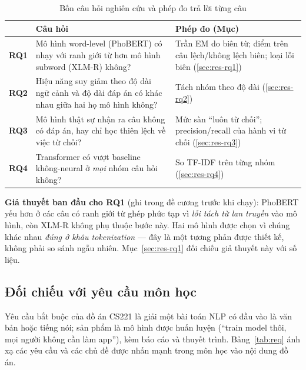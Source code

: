 \begin{table}[htbp]
\centering
\caption{Bốn câu hỏi nghiên cứu và phép đo trả lời từng câu}
\label{tab:rq}
\renewcommand{\arraystretch}{1.22}
\small
\begin{tabularx}{\textwidth}{@{}l L L@{}}
\toprule
& \textbf{Câu hỏi} & \textbf{Phép đo (Mục)} \\
\midrule
\textbf{RQ1} & Mô hình word-level (PhoBERT) có nhạy với ranh giới từ hơn mô hình subword (XLM-R) không? & Trần EM do biên từ; điểm trên câu lệch/không lệch biên; loại lỗi biên (\ref{sec:res-rq1}) \\
\textbf{RQ2} & Hiệu năng suy giảm theo độ dài ngữ cảnh và độ dài đáp án có khác nhau giữa hai họ mô hình không? & Tách nhóm theo độ dài (\ref{sec:res-rq2}) \\
\textbf{RQ3} & Mô hình thật sự nhận ra câu không có đáp án, hay chỉ học thiên lệch về việc từ chối? & Mức sàn ``luôn từ chối''; precision/recall của hành vi từ chối (\ref{sec:res-rq3}) \\
\textbf{RQ4} & Transformer có vượt baseline không-neural ở \emph{mọi} nhóm câu hỏi không? & So TF-IDF trên từng nhóm (\ref{sec:res-rq4}) \\
\bottomrule
\end{tabularx}
\end{table}

\textbf{Giả thuyết ban đầu cho RQ1} (ghi trong đề cương trước khi chạy): PhoBERT yếu hơn ở
các câu có ranh giới từ ghép phức tạp vì \emph{lỗi tách từ lan truyền} vào mô hình, còn
XLM-R không phụ thuộc bước này. Hai mô hình được chọn vì chúng khác nhau \emph{đúng ở khâu
tokenization} --- đây là một tương phản được thiết kế, không phải so sánh ngẫu nhiên.
Mục~\ref{sec:res-rq1} đối chiếu giả thuyết này với số liệu.

\subsection{Đối chiếu với yêu cầu môn học}
\label{sec:requirements}

Yêu cầu bắt buộc của đồ án CS221 là giải một bài toán NLP có đầu vào là văn bản hoặc tiếng
nói; sản phẩm là mô hình được huấn luyện (``train model thôi, mọi người không cần làm
app''), kèm báo cáo và thuyết trình. Bảng~\ref{tab:req} ánh xạ các yêu cầu và các chủ đề
được nhấn mạnh trong môn học vào nội dung đồ án.

